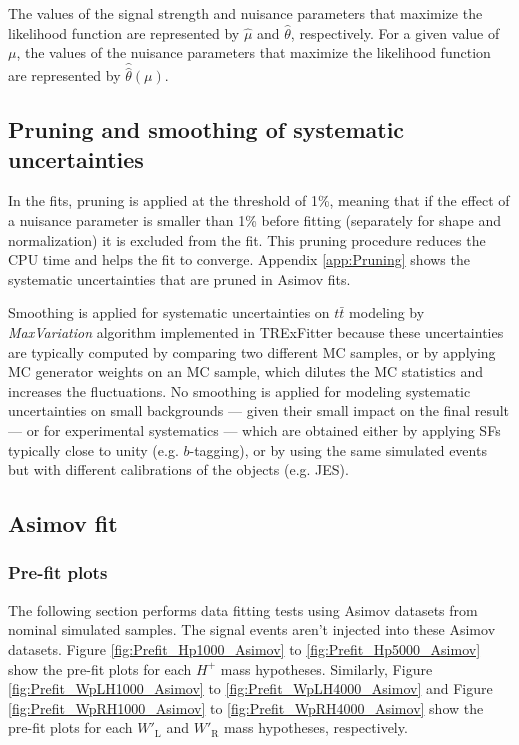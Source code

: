 The values of the signal strength and nuisance parameters that maximize the likelihood function are represented by $\hat{\mu}$ and $\hat{\theta}$, respectively. For a given value of $\mu$, the values of the nuisance parameters that maximize the likelihood function are represented by $\hat{\hat{\theta}}(\mu)$.

\subsection{Pruning and smoothing of systematic uncertainties}
\label{subsec:PruningAndSmoothing}
In the fits, pruning is applied at the threshold of 1\%, meaning that if the effect of a nuisance parameter is smaller than 1\% before fitting (separately for shape and normalization) it is excluded from the fit. This pruning procedure reduces the CPU time and helps the fit to converge. Appendix \ref{app:Pruning} shows the systematic uncertainties that are pruned in Asimov fits. 

Smoothing is applied for systematic uncertainties on $t\bar{t}$ modeling by \textit{MaxVariation} algorithm implemented in TRExFitter because these uncertainties are typically computed by comparing two different MC samples, or by applying MC generator weights on an MC sample, which dilutes the MC statistics and increases the fluctuations. No smoothing is applied for modeling systematic uncertainties on small backgrounds --- given their small impact on the final result --- or for experimental systematics --- which are obtained either by applying SFs typically close to unity (e.g. $b$-tagging), or by using the same simulated events but with different calibrations of the objects (e.g. JES).

\subsection{Asimov fit}
\label{subsec:AsimovFit}

\subsubsection{Pre-fit plots}
\label{subsubsec:PrefitPlotsForAsimov}
The following section performs data fitting tests using Asimov datasets from nominal simulated samples. The signal events aren't injected into these Asimov datasets. Figure \ref{fig:Prefit_Hp1000_Asimov} to \ref{fig:Prefit_Hp5000_Asimov} show the pre-fit plots for each $H^{+}$ mass hypotheses. Similarly,  Figure \ref{fig:Prefit_WpLH1000_Asimov} to \ref{fig:Prefit_WpLH4000_Asimov} and  Figure \ref{fig:Prefit_WpRH1000_Asimov} to \ref{fig:Prefit_WpRH4000_Asimov} show the pre-fit plots for each $W'_{\text{L}}$ and $W'_{\text{R}}$ mass hypotheses, respectively.

